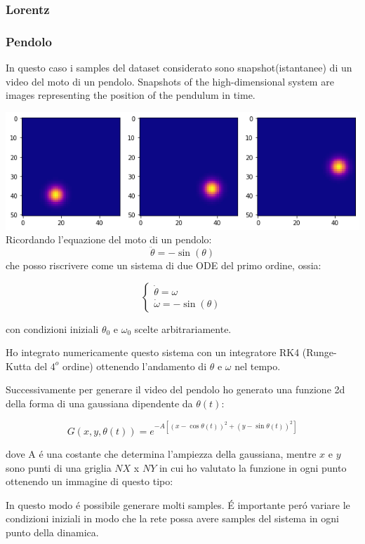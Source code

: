 \documentclass[11pt]{article}
\begin{document}
\subsubsection{Lorentz}

\subsubsection{Pendolo}
In questo caso i samples del dataset considerato sono snapshot(istantanee) di un video del moto di un pendolo.
Snapshots of the high-dimensional
system are images representing the position of the pendulum in time. 

\includegraphics[width=\textwidth]{pendulum_motion}
Ricordando l'equazione del moto di un pendolo:
$$ \ddot{\theta} = - \sin(\theta) $$
che posso riscrivere come un sistema di due ODE del primo ordine, ossia:

$$
\begin{cases} 
\dot{\theta} = \omega \\ 
\dot{\omega} = - \sin(\theta)
\end{cases}
$$

con condizioni iniziali $\theta_0$ e $\omega_0$ scelte arbitrariamente.

Ho integrato numericamente questo sistema con un integratore RK4 (Runge-Kutta del $4^o$ ordine) ottenendo l'andamento di $\theta$ e $\omega$ nel tempo.

Successivamente per generare il video del pendolo ho generato una funzione 2d della forma di una gaussiana dipendente da $\theta(t)$:


$$G(x,y,\theta(t)) = e^{-A[(x - \cos{\theta(t)})^2 + (y - \sin{\theta(t)})^2]}$$

dove A é una costante che determina l'ampiezza della gaussiana, mentre $x$ e $y$ sono punti di una griglia $NX$ x $NY$ in cui ho valutato la funzione in ogni punto ottenendo un immagine di questo tipo:

In questo modo é possibile generare molti samples.
É importante peró variare le condizioni iniziali in modo che la rete possa avere samples del sistema in ogni punto della dinamica.
\end{document}
